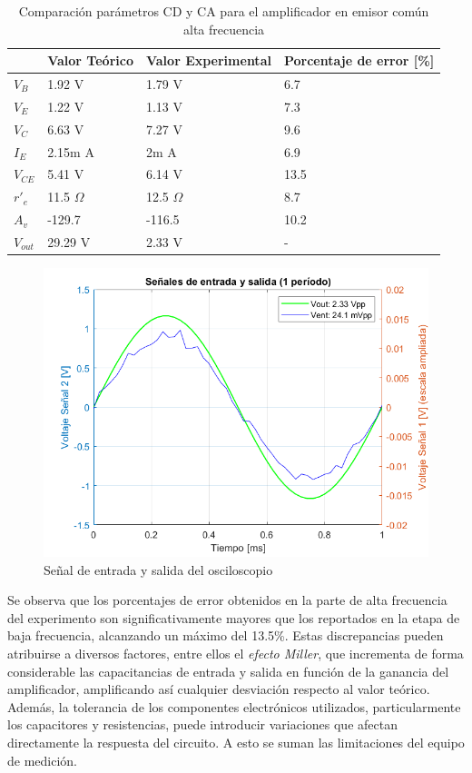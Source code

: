 \documentclass[journal]{IEEEtran}
\begin{document}
\begin{table}[h]
    \caption{Comparación parámetros CD y CA para el amplificador en emisor común alta frecuencia}
    \centering
    \renewcommand{\arraystretch}{1.2} %
    \begin{tabular}{|l|p{2cm}|p{2cm}|p{2cm}|}
        \hline
        & \textbf{Valor Teórico} & \textbf{Valor Experimental} & \textbf{Porcentaje de error [\%]} \\
        \hline
        \( V_B \) & 1.92 V  & 1.79 V  & 6.7 \\
        \hline
        \( V_E \) & 1.22 V   & 1.13 V  & 7.3 \\
        \hline
        \( V_C \) & 6.63 V & 7.27 V & 9.6 \\
        \hline
        \( I_E \) & 2.15m A & 2m A & 6.9 \\
        \hline
        \( V_{CE} \) & 5.41 V & 6.14 V & 13.5 \\
        \hline
        \( r'_{e} \) & 11.5 $\Omega$ & 12.5 $\Omega$ & 8.7 \\
        \hline
        \( A_{v} \) & -129.7   & -116.5  & 10.2 \\
        \hline
        \( V_{out} \) & 29.29 V & 2.33 V & - \\
        \hline
    \end{tabular}
    \label{tab:parámetrosCDyCA}
\end{table}
\begin{figure}[H]
    \centering
    \includegraphics[width=0.8\linewidth]{fig2.png}
    \caption{Señal de entrada y salida del osciloscopio}
    \label{fig:fig2}
\end{figure}

\par Se observa que los porcentajes de error obtenidos en la parte de alta frecuencia del experimento son significativamente mayores que los reportados en la etapa de baja frecuencia, alcanzando un máximo del 13.5\%. Estas discrepancias pueden atribuirse a diversos factores, entre ellos el \textit{efecto Miller}, que incrementa de forma considerable las capacitancias de entrada y salida en función de la ganancia del amplificador, amplificando así cualquier desviación respecto al valor teórico. Además, la tolerancia de los componentes electrónicos utilizados, particularmente los capacitores y resistencias, puede introducir variaciones que afectan directamente la respuesta del circuito. A esto se suman las limitaciones del equipo de medición.
\end{document}
